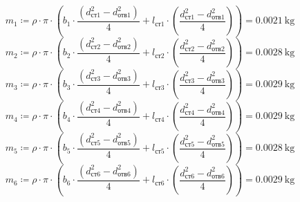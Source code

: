 \documentclass{article}
\newcommand{\defeq}{\coloneq} %
\begin{document}
\begin{equation*}
\textit{m}_{\textit{1}} \defeq {\rho} \cdot {\pi} \cdot \left( \textit{b}_{\textit{1}} \cdot \frac{\left( \textit{d}_{\textit{ст1}}^{2}-\textit{d}_{\textit{отв1}}^{2} \right)}{4}+\textit{l}_{\textit{ст1}} \cdot \left( \frac{\textit{d}_{\textit{ст1}}^{2}-\textit{d}_{\textit{отв1}}^{2}}{4} \right) \right) = {0.0021 \: \mathrm{kg}}
\end{equation*}
\begin{equation*}
\textit{m}_{\textit{2}} \defeq {\rho} \cdot {\pi} \cdot \left( \textit{b}_{\textit{2}} \cdot \frac{\left( \textit{d}_{\textit{ст2}}^{2}-\textit{d}_{\textit{отв2}}^{2} \right)}{4}+\textit{l}_{\textit{ст2}} \cdot \left( \frac{\textit{d}_{\textit{ст2}}^{2}-\textit{d}_{\textit{отв2}}^{2}}{4} \right) \right) = {0.0028 \: \mathrm{kg}}
\end{equation*}
\begin{equation*}
\textit{m}_{\textit{3}} \defeq {\rho} \cdot {\pi} \cdot \left( \textit{b}_{\textit{3}} \cdot \frac{\left( \textit{d}_{\textit{ст3}}^{2}-\textit{d}_{\textit{отв3}}^{2} \right)}{4}+\textit{l}_{\textit{ст3}} \cdot \left( \frac{\textit{d}_{\textit{ст3}}^{2}-\textit{d}_{\textit{отв3}}^{2}}{4} \right) \right) = {0.0029 \: \mathrm{kg}}
\end{equation*}
\begin{equation*}
\textit{m}_{\textit{4}} \defeq {\rho} \cdot {\pi} \cdot \left( \textit{b}_{\textit{4}} \cdot \frac{\left( \textit{d}_{\textit{ст4}}^{2}-\textit{d}_{\textit{отв4}}^{2} \right)}{4}+\textit{l}_{\textit{ст4}} \cdot \left( \frac{\textit{d}_{\textit{ст4}}^{2}-\textit{d}_{\textit{отв4}}^{2}}{4} \right) \right) = {0.0029 \: \mathrm{kg}}
\end{equation*}
\begin{equation*}
\textit{m}_{\textit{5}} \defeq {\rho} \cdot {\pi} \cdot \left( \textit{b}_{\textit{5}} \cdot \frac{\left( \textit{d}_{\textit{ст5}}^{2}-\textit{d}_{\textit{отв5}}^{2} \right)}{4}+\textit{l}_{\textit{ст5}} \cdot \left( \frac{\textit{d}_{\textit{ст5}}^{2}-\textit{d}_{\textit{отв5}}^{2}}{4} \right) \right) = {0.0028 \: \mathrm{kg}}
\end{equation*}
\begin{equation*}
\textit{m}_{\textit{6}} \defeq {\rho} \cdot {\pi} \cdot \left( \textit{b}_{\textit{6}} \cdot \frac{\left( \textit{d}_{\textit{ст6}}^{2}-\textit{d}_{\textit{отв6}}^{2} \right)}{4}+\textit{l}_{\textit{ст6}} \cdot \left( \frac{\textit{d}_{\textit{ст6}}^{2}-\textit{d}_{\textit{отв6}}^{2}}{4} \right) \right) = {0.0029 \: \mathrm{kg}}
\end{equation*}
\end{document}
